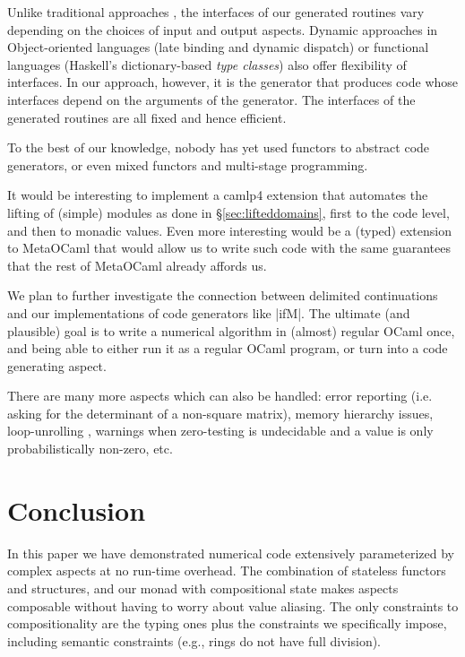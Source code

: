 \documentclass{elsart}
\begin{document}
Unlike traditional approaches
\cite{journals/cacm/parnas72a}, the interfaces of our generated
routines vary depending on the choices of input and output
aspects. Dynamic approaches in Object-oriented languages (late binding
and dynamic dispatch) or functional languages (Haskell's
dictionary-based \emph{type classes}) also offer flexibility of
interfaces. In our approach, however, it is the generator that
produces code whose interfaces depend on the arguments of the
generator. The interfaces of the generated routines are all fixed and
hence efficient.

To the best of our knowledge, nobody has yet used functors to
abstract code generators, or even mixed functors and 
multi-stage programming.

It would be interesting to implement a camlp4 extension that 
automates the lifting of (simple) modules as done in 
\S\ref{sec:lifteddomains},
first to the code level, and then to monadic values.  Even more
interesting would be a (typed) extension to MetaOCaml that would 
allow us to write such code with the same guarantees that the rest of
MetaOCaml already affords us.

We plan to further investigate the connection between delimited
continuations and our implementations of code generators like
|ifM|. The ultimate (and plausible) goal is to write a numerical
algorithm in (almost) regular OCaml once, and being able to either
run it as a regular OCaml program, or turn into a code generating
aspect.

There are many more aspects which can also be handled:
error reporting (i.e. asking for the determinant of a 
non-square matrix), memory hierarchy issues, loop-unrolling
\cite{scp-CohenDGHKP06},
warnings when zero-testing is undecidable and
a value is only probabilistically non-zero, etc.

\section{Conclusion}\label{conclusion}
In this paper we have demonstrated numerical code extensively parameterized
by complex aspects at no run-time overhead.  The combination of
stateless functors and structures, and our monad with
compositional state makes aspects composable without having to
worry about value aliasing. The only constraints to compositionality
are the typing ones plus the constraints we specifically
impose, including semantic constraints (e.g., rings do not have full
division).
\end{document}
